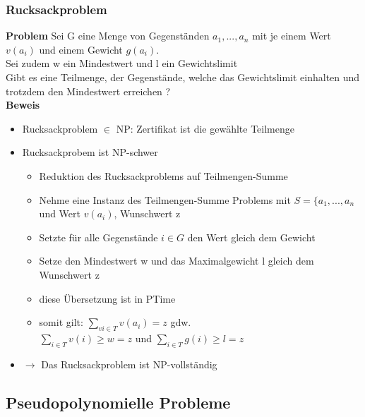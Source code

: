 \documentclass[12pt,a4paper]{article}
\begin{document}
\subsubsection{Rucksackproblem}
\textbf{Problem}
Sei G eine Menge von Gegenständen $a_1,...,a_n$ mit je einem Wert $v(a_i)$ und einem Gewicht $g(a_i)$.\\
Sei zudem w ein Mindestwert und l ein Gewichtslimit\\
Gibt es eine Teilmenge, der Gegenstände, welche das Gewichtslimit einhalten und trotzdem den Mindestwert erreichen ?\\

\textbf{Beweis}
\begin{itemize}
\item Rucksackproblem $\in$ NP: Zertifikat ist die gewählte Teilmenge
\item Rucksackprobem ist NP-schwer
\begin{itemize}
\item Reduktion des Rucksackproblems auf Teilmengen-Summe
\item Nehme eine Instanz des Teilmengen-Summe Problems mit $S = \{a_1,...,a_n$ und Wert $v(a_i)$, Wunschwert z
\item Setzte für alle Gegenstände $i\in G$ den Wert gleich dem Gewicht
\item Setze den Mindestwert w und das Maximalgewicht l gleich dem Wunschwert z
\item diese Übersetzung ist in PTime
\item somit gilt: $\sum_{vi\in T} v(a_i) = z$ gdw.\\
$\sum_{i\in T} v(i) \geq w = z$ und $\sum_{i\in T} g(i) \geq l = z$
\end{itemize}
\item $\rightarrow$ Das Rucksackproblem ist NP-vollständig
\end{itemize}

\subsection{Pseudopolynomielle Probleme}
\end{document}
